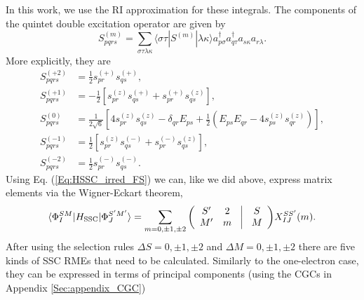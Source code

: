 In this work, we use the RI approximation for these integrals.\cite{GanyuGTMN_2010_144111} The components of the quintet double excitation operator are given by
	\begin{equation}
	S_{pqrs}^{(m)} = \sum\limits_{\sigma \tau \lambda \kappa } {\langle \sigma \tau |{S^{(m)}}|\lambda \kappa \rangle }   a_{p\sigma }^\dag a_{q\tau }^\dag {a_{s\kappa }}{a_{r\lambda }}.
	\end{equation} 	
More explicitly, they are
\begin{align}
S_{pqrs}^{( + 2)} &= \frac{1}{2}s_{pr}^{( + )}s_{qs}^{( + )},	\\
S_{pqrs}^{( + 1)} &=  - \frac{1}{2}[s_{pr}^{(z)}s_{qs}^{( + )} + s_{pr}^{( + )}s_{qs}^{(z)}], \\
S_{pqrs}^{(0)} &= \frac{1}{{2\sqrt 6 }}\left[ {4s_{pr}^{(z)}s_{qs}^{(z)} - {\delta _{qr}}{E_{ps}} + \frac{1}{2}({E_{ps}}{E_{qr}} - 4s_{ps}^{(z)}s_{qr}^{(z)})} \right], \\
S_{pqrs}^{( - 1)} &= \frac{1}{2}[s_{pr}^{(z)}s_{qs}^{( - )} + s_{pr}^{( - )}s_{qs}^{(z)}], \\
S_{pqrs}^{( - 2)} &= \frac{1}{2}s_{pr}^{( - )}s_{qs}^{( - )}. 	
\end{align}
Using Eq. (\ref{Eq:HSSC_irred_FS}) we can, like we did above, express matrix elements via the Wigner-Eckart theorem,
	\begin{equation}\langle \Phi _I^{SM}|{H_{{\text{SSC}}}}|\Phi _J^{S'M'}\rangle  = \sum\limits_{m = 0, \pm 1, \pm 2} {\left( {\begin{array}{*{20}{c}}
  {S'}&2&\vline & S \\ 
  {M'}&m&\vline & M 
\end{array}} \right)} X_{IJ}^{SS'}(m).
\end{equation} 	
After using the selection rules $\Delta S = 0, \pm 1, \pm 2$ and $\Delta M = 0, \pm 1, \pm 2$ there are five kinds of SSC RMEs that need to be calculated. Similarly to the one-electron case, they can be expressed in terms of principal components (using the CGCs in Appendix \ref{Sec:appendix_CGC})
